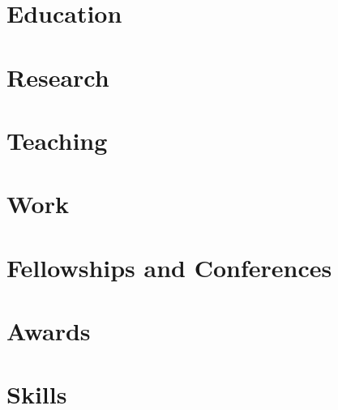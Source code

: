 \documentclass{prometheus_cv}
\begin{document}
\thispagestyle{empty}					%
\pagestyle{fancy}			 		%

\vspace*{-1cm}
\centering 


\vspace*{0.4cm}
\section{Education}


\section{Research}


\section{Teaching}

\newpage

\section{Work}


% 

\section{Fellowships and Conferences}



\section{Awards}



\section{Skills}

\end{document}
